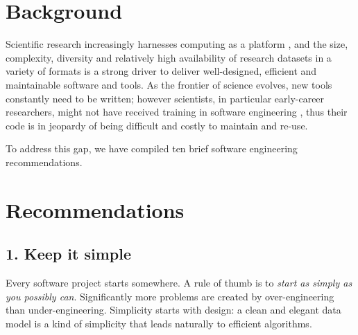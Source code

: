 \documentclass{bmcart}
\begin{document}


\section*{Background}

Scientific research increasingly harnesses computing as a platform \cite{goble2014}, and the size, complexity, diversity and relatively high availability of research datasets in a variety of formats is a strong driver to deliver well-designed, efficient and maintainable software and tools.
As the frontier of science evolves, new tools constantly need to be written; however scientists, in particular early-career researchers, might not have received training in software engineering \cite{wilson2014bestpractice}, thus their code is in jeopardy of being difficult and costly to maintain and re-use. 

To address this gap, we have compiled ten brief software engineering recommendations. 

\section*{Recommendations}

\subsection*{1. Keep it simple}

Every software project starts somewhere. A rule of thumb is to \textit{start as simply as you possibly can}. Significantly more problems are created by over-engineering than under-engineering. Simplicity starts with design: a clean and elegant data model is a kind of simplicity that leads naturally to efficient algorithms.  
 
\end{document}
